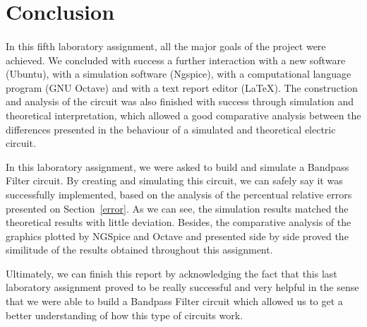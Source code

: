 \section{Conclusion}
\label{sec:conclusion}

\paragraph{}
In this fifth laboratory assignment, all the major goals of the project were achieved. We concluded with success a further interaction with a new software (Ubuntu), with a simulation software (Ngspice), with a computational language program (GNU Octave) and with a text report editor (LaTeX). The construction and analysis of the circuit was also finished with success through simulation and theoretical interpretation, which allowed a good comparative analysis between the differences presented in the behaviour of a simulated and theoretical electric circuit. 

In this laboratory assignment, we were asked to build and simulate a Bandpass Filter circuit. By creating and simulating this circuit, we can safely say it was successfully implemented, based on the analysis of the percentual relative errors presented on Section~\ref{error}. As we can see, the simulation results matched the theoretical results with little deviation. Besides, the comparative analysis of the graphics plotted by NGSpice and Octave and presented side by side proved the similitude of the results obtained throughout this assignment. 

Ultimately, we can finish this report by acknowledging the fact that this last laboratory assignment proved to be really successful and very helpful in the sense that we were able to build a Bandpass Filter circuit which allowed us to get a better understanding of how this type of circuits work.

